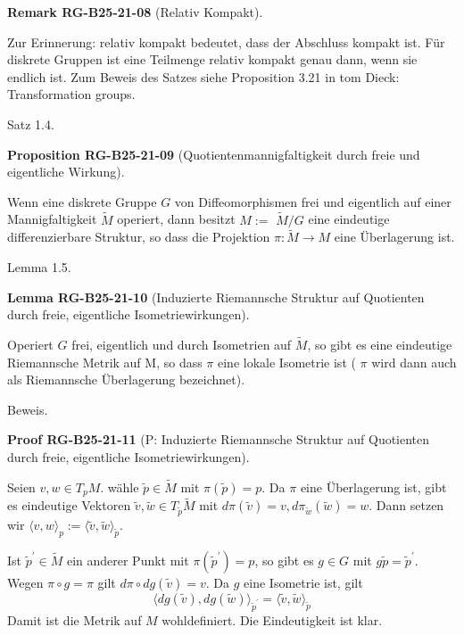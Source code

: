 \documentclass[10pt, letterpaper]{article}
\newcommand{\CustomHeading}[3]{%
  \par\medskip\noindent%
  \textbf{#1 #2} \textnormal{(#3)}.\enskip%
}
\newenvironment{PROP}[2]{\begin{unitbox}\CustomHeading{Proposition}{#1}{#2}}{\end{unitbox}}
\newenvironment{LEM}[2]{\begin{unitbox}\CustomHeading{Lemma}{#1}{#2}}{\end{unitbox}}
\newenvironment{REM}[2]{\begin{unitbox}\CustomHeading{Remark}{#1}{#2}}{\end{unitbox}}
\newenvironment{PROOF}[2]{\begin{unitbox}\CustomHeading{Proof}{#1}{#2}}{\end{unitbox}}
\begin{document}
\begin{REM}{RG-B25-21-08}{Relativ Kompakt}
Zur Erinnerung: relativ kompakt bedeutet, dass der Abschluss kompakt ist. Für diskrete Gruppen ist eine Teilmenge relativ kompakt genau dann, wenn sie endlich ist. Zum Beweis des Satzes siehe Proposition 3.21 in tom Dieck: Transformation groups.
\end{REM}



Satz 1.4. 

\begin{PROP}{RG-B25-21-09}{Quotientenmannigfaltigkeit durch freie und eigentliche Wirkung}
Wenn eine diskrete Gruppe $G$ von Diffeomorphismen frei und eigentlich auf einer Mannigfaltigkeit $\tilde{M}$ operiert, dann besitzt $M:=$ $\tilde{M} / G$ eine eindeutige differenzierbare Struktur, so dass die Projektion $\pi: \tilde{M} \rightarrow M$ eine Überlagerung ist.
\end{PROP}




Lemma 1.5. 

\begin{LEM}{RG-B25-21-10}{Induzierte Riemannsche Struktur auf Quotienten durch freie, eigentliche Isometriewirkungen}
Operiert $G$ frei, eigentlich und durch Isometrien auf $\tilde{M}$, so gibt es eine eindeutige Riemannsche Metrik auf M, so dass $\pi$ eine lokale Isometrie ist ( $\pi$ wird dann auch als Riemannsche Überlagerung bezeichnet).
\end{LEM}

Beweis. 

\begin{PROOF}{RG-B25-21-11}{P: Induzierte Riemannsche Struktur auf Quotienten durch freie, eigentliche Isometriewirkungen}
Seien $v, w \in T_{p} M$. wähle $\tilde{p} \in \tilde{M}$ mit $\pi(\tilde{p})=p$. Da $\pi$ eine Überlagerung ist, gibt es eindeutige Vektoren $\tilde{v}, \tilde{w} \in T_{\tilde{p}} \tilde{M}$ mit $d \pi(\tilde{v})=v, d \pi_{\tilde{w}}(\tilde{w})=w$. Dann setzen wir $\langle v, w\rangle_{p}:=\langle\tilde{v}, \tilde{w}\rangle_{\tilde{p}}$.

Ist $\tilde{p}^{\prime} \in \tilde{M}$ ein anderer Punkt mit $\pi\left(\tilde{p}^{\prime}\right)=p$, so gibt es $g \in G$ mit $g \tilde{p}=\tilde{p}^{\prime}$. Wegen $\pi \circ g=\pi$ gilt $d \pi \circ d g(\tilde{v})=v$. Da $g$ eine Isometrie ist, gilt
$$
\langle d g(\tilde{v}), d g(\tilde{w})\rangle_{\tilde{p}^{\prime}}=\langle\tilde{v}, \tilde{w}\rangle_{\tilde{p}}
$$
Damit ist die Metrik auf $M$ wohldefiniert. Die Eindeutigkeit ist klar.
\end{PROOF}
\end{document}

